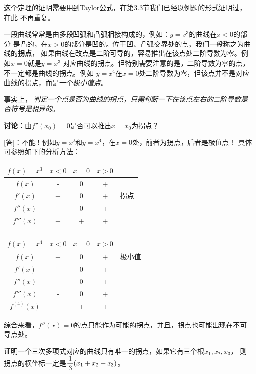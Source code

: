 这个定理的证明需要用到Taylor公式，在第3.3节我们已经以例题的形式证明过，在此
不再重复。

一段曲线常常是由多段凹弧和凸弧相接构成的，例如：$y=x^3$的曲线在$x<0$的部分
是凸的，在$x>0$的部分是凹的。位于凹、凸弧交界处的点，我们一般称之为曲线的{\bf 拐点}，
如果曲线在改点是二阶可导的，容易推出在该点处二阶导数为零。例如$x=0$就是$y=x^3$
对应曲线的拐点。但特别需要注意的是，二阶导数为零的点，不一定都是曲线的拐点。例如
$y=x^4$在$x=0$处二阶导数为零，但该点并不是对应曲线的拐点，而是一个{\it 极小值点}。

事实上，{\it\b 要判定一个点是否为曲线的拐点，只需判断一下在该点左右的二阶导数是否符号是相异的}。

\begin{shaded}
	{\bf 讨论：}由$f''(x_0)=0$是否可以推出$x=x_0$为拐点？

	[答]：不能！例如$y=x^3$和$y=x^4$，在$x=0$处，前者为拐点，后者是极值点！
	具体可参照如下的分析方法：
	\begin{center}
	\begin{tabular}{c||c|c|c|c}
		\hline 
		$f(x)=x^3$ & $x<0$ & $x=0$ & $x>0$ & \\ 
		\hline 
		$f(x)$ & - & 0 & + & \\ 
		\hline 
		$f'(x)$ & + & 0 & + & 拐点\\ 
		\hline 
		$f''(x)$ & - & 0 & + & \\ 
		\hline 
		$f'''(x)$ & + & + & + & \\ 
		\hline 
		 &  &  &  &  \\ 
		\hline 
	\end{tabular} 
	\begin{tabular}{c||c|c|c|c}
		\hline 
		$f(x)=x^4$ & $x<0$ & $x=0$ & $x>0$ & \\ 
		\hline 
		$f(x)$ & + & 0 & + & 极小值\\ 
		\hline 
		$f'(x)$ & - & 0 & + & \\ 
		\hline 
		$f''(x)$ & + & 0 & + & \\ 
		\hline 
		$f'''(x)$ & - & 0 & + & \\ 
		\hline 
		$f^{(4)}(x)$ & + & + & + & \\ 
		\hline 
	\end{tabular} 
	\end{center}
	
	综合来看，$f''(x)=0$的点只能作为可能的拐点，并且，拐点也可能出现在不可导点处。
\end{shaded}

\egz 证明一个三次多项式对应的曲线只有唯一的拐点，如果它有三个根$x_1,x_2,x_3$，
则拐点的横坐标一定是$\displaystyle\frac{\,{1}\,}{\,{3}\,}(x_1+x_2+x_3)$。

